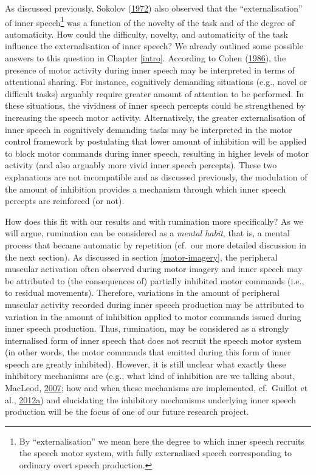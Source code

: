 \documentclass[a4paper,12pt,twoside,onecolumn,openright,final,oldfontcommands]{memoir}
\let\rmarkdownfootnote\footnote%
\def\footnote{\protect\rmarkdownfootnote}
\begin{document}
As discussed previously, Sokolov (\protect\hyperlink{ref-sokolov_inner_1972}{1972}) also observed that the \enquote{externalisation} of inner speech\footnote{By \enquote{externalisation} we mean here the degree to which inner speech recruits the speech motor system, with fully externalised speech corresponding to ordinary overt speech production.} was a function of the novelty of the task and of the degree of automaticity. How could the difficulty, novelty, and automaticity of the task influence the externalisation of inner speech? We already outlined some possible answers to this question in Chapter \ref{intro}. According to Cohen (\protect\hyperlink{ref-cohen_motor_1986}{1986}), the presence of motor activity during inner speech may be interpreted in terms of attentional sharing. For instance, cognitively demanding situations (e.g., novel or difficult tasks) arguably require greater amount of attention to be performed. In these situations, the vividness of inner speech percepts could be strengthened by increasing the speech motor activity. Alternatively, the greater externalisation of inner speech in cognitively demanding tasks may be interpreted in the motor control framework by postulating that lower amount of inhibition will be applied to block motor commands during inner speech, resulting in higher levels of motor activity (and also arguably more vivid inner speech percepts). These two explanations are not incompatible and as discussed previously, the modulation of the amount of inhibition provides a mechanism through which inner speech percepts are reinforced (or not).

How does this fit with our results and with rumination more specifically? As we will argue, rumination can be considered as a \emph{mental habit}, that is, a mental process that became automatic by repetition (cf.~our more detailed discussion in the next section). As discussed in section \ref{motor-imagery}, the peripheral muscular activation often observed during motor imagery and inner speech may be attributed to (the consequences of) partially inhibited motor commands (i.e., to residual movements). Therefore, variations in the amount of peripheral muscular activity recorded during inner speech production may be attributed to variation in the amount of inhibition applied to motor commands issued during inner speech production. Thus, rumination, may be considered as a strongly internalised form of inner speech that does not recruit the speech motor system (in other words, the motor commands that emitted during this form of inner speech are greatly inhibited). However, it is still unclear what exactly these inhibitory mechanisms are (e.g., what kind of inhibition are we talking about, MacLeod, \protect\hyperlink{ref-gorfein_concept_2007}{2007}; how and when these mechanisms are implemented, cf.~Guillot et al., \protect\hyperlink{ref-guillot_imagining_2012}{2012}\protect\hyperlink{ref-guillot_imagining_2012}{a}) and elucidating the inhibitory mechanisms underlying inner speech production will be the focus of one of our future research project.
\end{document}
